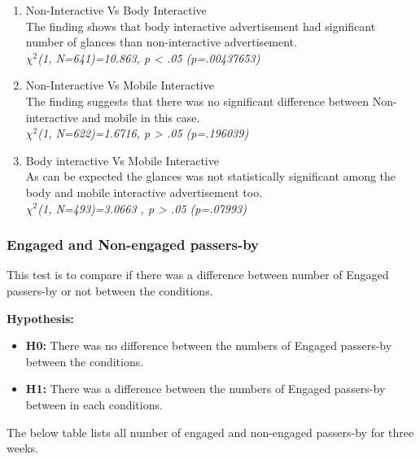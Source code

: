 \begin{enumerate}
\item Non-Interactive Vs Body Interactive \\
The finding shows that body interactive advertisement had significant number of glances than non-interactive advertisement. \\
${\chi}^2$\emph{(1, N=641)=10.863, p < .05 (p=.00437653)}



\item Non-Interactive Vs Mobile Interactive  \\
The finding suggests that there was no significant difference between Non-interactive and mobile in this case.\\
${\chi}^2$\emph{(1, N=622)=1.6716, p > .05 (p=.196039)}

\item Body interactive Vs Mobile Interactive \\
As can be expected the glances was not statistically significant among the body and mobile interactive advertisement too.\\
${\chi}^2$\emph{(1, N=493)=3.0663 , p > .05 (p=.07993)}

\end{enumerate}


\subsubsection {Engaged and Non-engaged passers-by}
This test is to compare if there was a difference between number of Engaged passers-by or not between the conditions.

\textbf{Hypothesis: }
\begin{itemize}
\item \textbf{H0:} There was no difference between the numbers of Engaged passers-by between the conditions.
\item \textbf{H1:} There was a difference between the numbers of Engaged passers-by between in each conditions.
\end{itemize}

The below table lists all number of engaged and non-engaged passers-by for three weeks.


